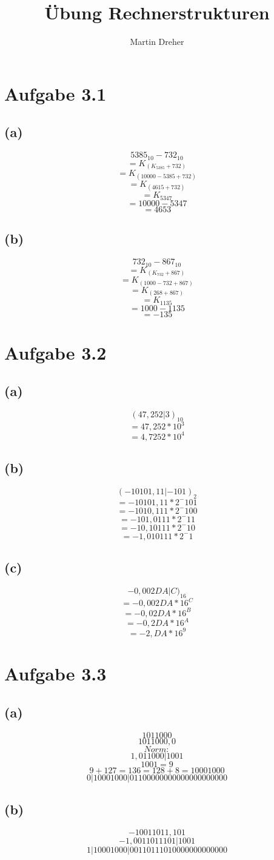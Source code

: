 \documentclass[12pt,a4paper]{article}
\author{Martin Dreher}
\title{Übung Rechnerstrukturen}
\begin{document}
 

\section*{Aufgabe 3.1}
\subsection*{(a)}
\[5385_{10} - 732_{10}\]
\[= K_(K_5385 + 732)\]
\[= K_(10000-5385 + 732)\]
\[= K_(4615 + 732)\]
\[= K_5347\]
\[= 10000-5347\]
\[= 4653\]
\subsection*{(b)}
\[732_{10} - 867_{10}\]
\[= K_(K_732 + 867)\]
\[= K_(1000-732 + 867)\]
\[= K_(268 + 867)\]
\[= K_1135\]
\[= 1000-1135\]
\[= -135\]

\section*{Aufgabe 3.2}
\subsection*{(a)}
\[(47,252|3)_{10}\]
\[= 47,252 * 10^3\]
\[= 4,7252 * 10^4\]
\subsection*{(b)}
\[(-10101,11|-101)_2\]
\[= -10101,11 * 2^-101\]
\[= -1010,111 * 2^-100\]
\[= -101,0111 * 2^-11\]
\[= -10,10111 * 2^-10\]
\[= -1,010111 * 2^-1\]
\subsection*{(c)}
\[-0,002DA|C)_{16}\]
\[= -0,002DA * 16^C\]
\[= -0,02DA * 16^B\]
\[= -0,2DA * 16^A\]
\[= -2,DA * 16^9\]

\section*{Aufgabe 3.3}
\subsection*{(a)}
\[101 1000\]
\[1011000,0\]
\[Norm:\]
\[1,011000 | 1001\]
\[1001 = 9\]
\[9 + 127 = 136 = 128 + 8 = 10001000\]
\[0 | 10001000 | 01100000000000000000000\]
\subsection*{(b)}
\[-10011011,101\]
\[-1,0011011101 | 1001\]
\[1 | 10001000 | 00110111010000000000000\]
\end{document}
